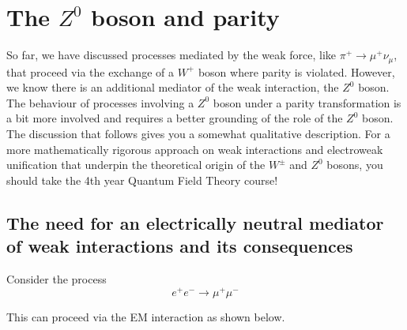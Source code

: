 \section{The $Z^0$ boson and parity}

So far, we have discussed processes mediated by the weak force, like $\pi^+\to \mu^+\nu_\mu$, that proceed via the exchange of a $W^+$ boson where parity is violated. However, we know there is an additional mediator of the weak interaction, the $Z^0$ boson. The behaviour of processes involving a $Z^0$ boson under a parity transformation is a bit more involved and requires a better grounding of the role of the $Z^0$ boson. The discussion that follows gives you a somewhat qualitative description. For a more mathematically rigorous approach on weak interactions and electroweak unification that underpin the theoretical origin of the $W^\pm$ and $Z^0$ bosons, you should take the 4th year Quantum Field Theory course!

\subsection{The need for an electrically neutral mediator of weak interactions and its consequences}

Consider the process \[e^+e^-\to\mu^+\mu^-\]

This can proceed via the EM interaction as shown below.

\begin{center}
\end{center}

